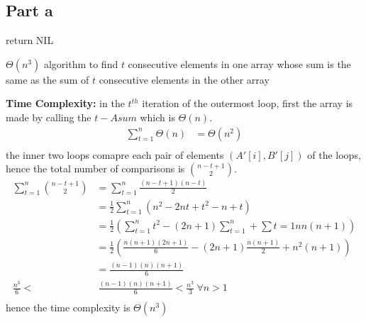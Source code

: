 \documentclass{article}
\begin{document}
\subsection*{Part a}
\begin{algorithm}
    return NIL\;
    \caption{$\varTheta(n^3)$ algorithm to find $t$ consecutive elements in one array whose sum is the same as the sum of $t$ consecutive elements in the other array}
\end{algorithm}
\textbf{Time Complexity:} in the $t^{th}$ iteration of the outermost loop, first the array is made by calling the $t-Asum$ which is $\varTheta(n)$.
\begin{align*}
    \sum_{t=1}^{n}\varTheta(n) &= \varTheta(n^2)\\
\end{align*}                                                                                                                                         
the inner two loops comapre each pair of elements $(A'[i], B'[j])$ of the loops, hence the total number of comparisons is $\binom{n-t+1}{2}$.\\
\begin{align*}
    \sum_{t=1}^{n}\binom{n-t+1}{2} &= \sum_{t=1}^{n}\frac{(n-t+1)(n-t)}{2}\\
    &= \frac{1}{2}\sum_{t=1}^{n}(n^2 - 2nt + t^2 - n + t)\\
    &= \frac{1}{2}(\sum_{t=1}^{n}t^2 - (2n + 1)\sum_{t=1}^{n} + \sum{t=1}{n}n(n+1))\\
    &= \frac{1}{2}(\frac{n(n+1)(2n+1)}{6} - (2n+1)\frac{n(n+1)}{2} + n^2(n+1))\\
    &= \frac{(n-1)(n)(n+1)}{6}\\
    \frac{n^3}{6} < & ~ \frac{(n-1)(n)(n+1)}{6} < \frac{n^3}{3} ~ \forall n>1\\
\end{align*}
hence the time complexity is $\varTheta(n^3)$\\\\
\newpage
\end{document}
